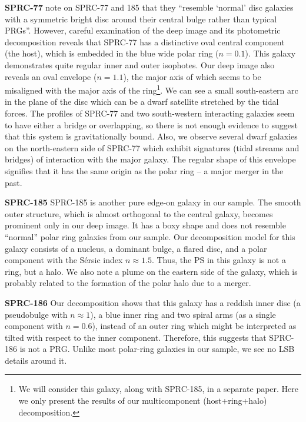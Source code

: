 \documentclass{raa}
\begin{document}
{\bf SPRC-77}
\citet{fink2012} note on SPRC-77 and 185 that they ``resemble `normal' disc galaxies with a symmetric bright disc around their central bulge rather than typical PRGs''. However, careful examination of the deep image and its photometric decomposition reveals that SPRC-77 has a distinctive oval central component (the host), which is embedded in the blue wide polar ring ($n=0.1$).
This galaxy demonstrates quite regular inner and outer isophotes. 
Our deep image also reveals an oval envelope ($n=1.1$), the major axis of which seems to be misaligned with the major axis of the ring\footnote{We will consider this galaxy, along with SPRC-185, in a separate paper. Here we only present the results of our multicomponent (host+ring+halo) decomposition.}.
We can see a small south-eastern arc in the plane of the disc which can be a dwarf satellite stretched by the tidal forces. 
The profiles of SPRC-77 and two south-western interacting galaxies seem to have either a bridge or overlapping, so there is not enough evidence to suggest that this system is gravitationally bound. 
Also, we observe several dwarf galaxies on the north-eastern side of SPRC-77 which exhibit signatures (tidal streams and bridges) of interaction with the major galaxy. The regular shape of this envelope signifies that it has the same origin as the polar ring -- a major merger in the past.


{\bf SPRC-185}
SPRC-185 is another pure edge-on galaxy in our sample. The smooth outer structure, which is almost orthogonal to the central galaxy, becomes prominent only in our deep image. It has a boxy shape and does not resemble ``normal'' polar ring galaxies  from our sample. Our decomposition model for this galaxy consists of a nucleus, a dominant bulge, a flared disc, and a polar component with the S\'ersic index $n\approx 1.5$. Thus, the PS in this galaxy is not a ring, but a halo. We also note a plume on the eastern side of the galaxy, which is probably related to the formation of the polar halo due to a merger.

{\bf SPRC-186}
Our decomposition shows that this galaxy has a reddish inner disc (a pseudobulge with $n\approx1$), a blue inner ring and two spiral arms (as a single component with $n=0.6$), instead of an outer ring which might be interpreted as tilted with respect to the inner component. Therefore, this suggests that SPRC-186 is not a PRG. Unlike most polar-ring galaxies in our sample, we see no LSB details around it.
\end{document}
